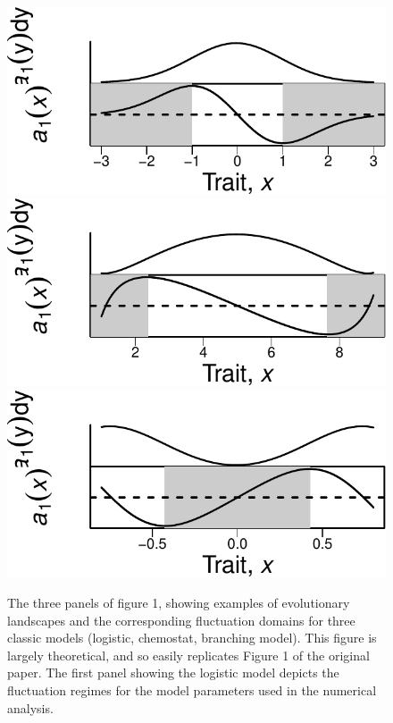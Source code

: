 \documentclass[
]{rescience}
\begin{document}
\begin{figure}
\includegraphics{article_files/figure-latex/fig1-1} \includegraphics{article_files/figure-latex/fig1-2} \includegraphics{article_files/figure-latex/fig1-3} \caption{The three panels of figure 1, showing examples of evolutionary landscapes and the corresponding fluctuation domains for three classic models (logistic, chemostat, branching model). This figure is largely theoretical, and so easily replicates Figure 1 of the original paper.  The first panel showing the logistic model depicts the fluctuation regimes for the model parameters used in the numerical analysis.}\label{fig:fig1}
\end{figure}
\end{document}
